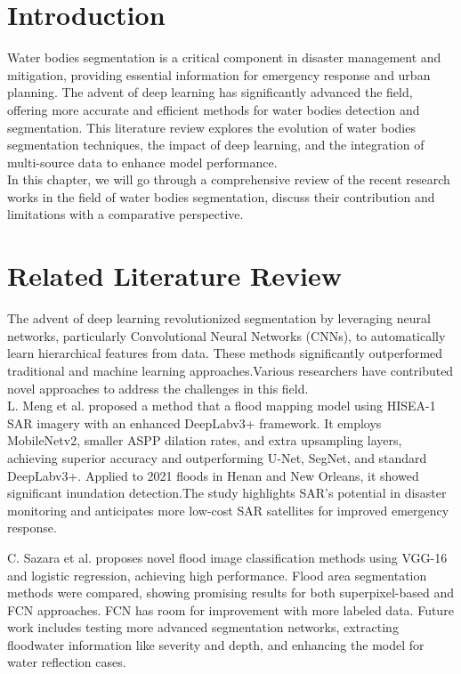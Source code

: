 \section{Introduction}
Water bodies segmentation is a critical component in disaster management and mitigation, providing essential information for emergency response and urban planning. The advent of deep learning has significantly advanced the field, offering more accurate and efficient methods for water bodies detection and segmentation. This literature review explores the evolution of water bodies segmentation techniques, the impact of deep learning, and the integration of multi-source data to enhance model performance.\\
In this chapter, we will go through a comprehensive review of the recent research works in the field of water bodies segmentation, discuss their contribution and limitations with a comparative perspective.


\section{Related Literature Review}

The advent of deep learning revolutionized segmentation by leveraging neural networks, particularly Convolutional Neural Networks (CNNs), to automatically learn hierarchical features from data. These methods significantly outperformed traditional and machine learning approaches.Various researchers have
contributed novel approaches to address the challenges in this field.\\

L. Meng et al. \cite{intro4} proposed a method that a flood mapping model using HISEA-1 SAR imagery with an enhanced DeepLabv3+ framework. It employs MobileNetv2, smaller ASPP dilation rates, and extra upsampling layers, achieving superior accuracy and outperforming U-Net, SegNet, and standard DeepLabv3+. Applied to 2021 floods in Henan and New Orleans, it showed significant inundation detection.The study highlights SAR's potential in disaster monitoring and anticipates more low-cost SAR satellites for improved emergency response.

C. Sazara et al. \cite{rel1} proposes novel flood image classification methods using VGG-16 and logistic regression, achieving high performance. Flood area segmentation methods were compared, showing promising results for both superpixel-based and FCN approaches. FCN has room for improvement with more labeled data. Future work includes testing more advanced segmentation networks, extracting floodwater information like severity and depth, and enhancing the model for water reflection cases.

